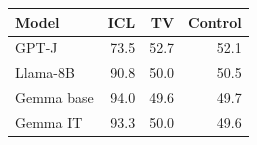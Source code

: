 \begin{tabular}{lrrr}
\toprule
Model & ICL & TV & Control \\
\midrule
GPT-J & 73.5 & 52.7 & 52.1 \\
Llama-8B & 90.8 & 50.0 & 50.5 \\
Gemma base & 94.0 & 49.6 & 49.7 \\
Gemma IT & 93.3 & 50.0 & 49.6 \\
\bottomrule
\end{tabular}
